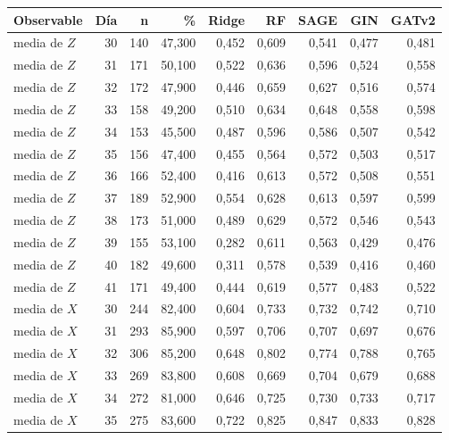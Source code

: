 \begin{table}[htbp]
    \centering
    {\footnotesize
    \begin{tabular}{@{}lrrrrrrrr@{}}
        \toprule
        \textbf{Observable} & \textbf{Día} & \textbf{n} & \textbf{\%} & \textbf{Ridge} & \textbf{RF} & \textbf{SAGE} & \textbf{GIN} & \textbf{GATv2} \\
        \midrule
        media de $Z$ & 30 & 140 & 47,300 & 0,452 & 0,609 & 0,541 & 0,477 & 0,481 \\
        media de $Z$ & 31 & 171 & 50,100 & 0,522 & 0,636 & 0,596 & 0,524 & 0,558 \\
        media de $Z$ & 32 & 172 & 47,900 & 0,446 & 0,659 & 0,627 & 0,516 & 0,574 \\
        media de $Z$ & 33 & 158 & 49,200 & 0,510 & 0,634 & 0,648 & 0,558 & 0,598 \\
        media de $Z$ & 34 & 153 & 45,500 & 0,487 & 0,596 & 0,586 & 0,507 & 0,542 \\
        media de $Z$ & 35 & 156 & 47,400 & 0,455 & 0,564 & 0,572 & 0,503 & 0,517 \\
        media de $Z$ & 36 & 166 & 52,400 & 0,416 & 0,613 & 0,572 & 0,508 & 0,551 \\
        media de $Z$ & 37 & 189 & 52,900 & 0,554 & 0,628 & 0,613 & 0,597 & 0,599 \\
        media de $Z$ & 38 & 173 & 51,000 & 0,489 & 0,629 & 0,572 & 0,546 & 0,543 \\
        media de $Z$ & 39 & 155 & 53,100 & 0,282 & 0,611 & 0,563 & 0,429 & 0,476 \\
        media de $Z$ & 40 & 182 & 49,600 & 0,311 & 0,578 & 0,539 & 0,416 & 0,460 \\
        media de $Z$ & 41 & 171 & 49,400 & 0,444 & 0,619 & 0,577 & 0,483 & 0,522 \\
        media de $X$ & 30 & 244 & 82,400 & 0,604 & 0,733 & 0,732 & 0,742 & 0,710 \\
        media de $X$ & 31 & 293 & 85,900 & 0,597 & 0,706 & 0,707 & 0,697 & 0,676 \\
        media de $X$ & 32 & 306 & 85,200 & 0,648 & 0,802 & 0,774 & 0,788 & 0,765 \\
        media de $X$ & 33 & 269 & 83,800 & 0,608 & 0,669 & 0,704 & 0,679 & 0,688 \\
        media de $X$ & 34 & 272 & 81,000 & 0,646 & 0,725 & 0,730 & 0,733 & 0,717 \\
        media de $X$ & 35 & 275 & 83,600 & 0,722 & 0,825 & 0,847 & 0,833 & 0,828 \\

\end{tabular}}
\end{table}
